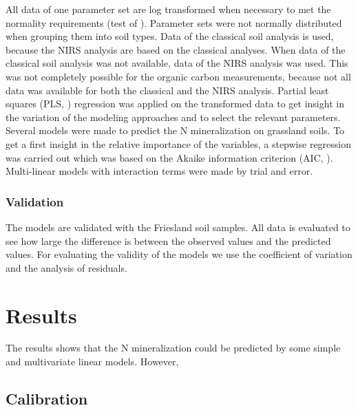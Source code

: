 \documentclass[10pt,twoside,dutch,english]{report}
\begin{document}
All data of one parameter set are log transformed when necessary to met the normality requirements (test of \citet{Shapiro1965}). Parameter sets were not normally distributed when grouping them into soil types. Data of the classical soil analysis is used, because the NIRS analysis are based on the classical analyses. When data of the classical soil analysis was not available, data of the NIRS analysis was used. This was not completely possible for the organic carbon measurements, because not all data was available for both the classical and the NIRS analysis. 
Partial least squares (PLS, \citep{Mevik2013}) regression was applied on the transformed data to get insight in the variation of the modeling approaches and to select the relevant parameters. 
Several models were made to predict the N mineralization on grassland soils. To get a first insight in the relative importance of the variables, a stepwise regression was carried out which was based on the Akaike information criterion (AIC, \citep{Sakamoto1986}). Multi-linear models with interaction terms were made by trial and error. 

\subsection{Validation}
The models are validated with the Friesland soil samples. All data is evaluated to see how large the difference is between the observed values and the predicted values. For evaluating the validity of the models we use the coefficient of variation and the analysis of residuals. 







\chapter{Results}

The results shows that the N mineralization could be predicted by some simple and multivariate linear models. However, 
\section{Calibration}
\end{document}
